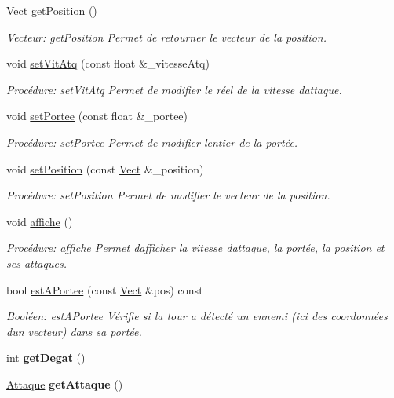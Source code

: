 \begin{DoxyCompactItemize}
\hyperlink{classVect}{Vect} \hyperlink{classTour_a2283f61d6b088bf41c53c882f4a72864}{get\+Position} ()
\begin{DoxyCompactList}\small\item\em Vecteur\+: get\+Position Permet de retourner le vecteur de la position. \end{DoxyCompactList}\item 
void \hyperlink{classTour_a110c73fc4160189cdafbb700f3999a39}{set\+Vit\+Atq} (const float \&\+\_\+vitesse\+Atq)
\begin{DoxyCompactList}\small\item\em Procédure\+: set\+Vit\+Atq Permet de modifier le réel de la vitesse d\textquotesingle{}attaque. \end{DoxyCompactList}\item 
void \hyperlink{classTour_a7f9a17a8138ebd8afe72520d7d8a18db}{set\+Portee} (const float \&\+\_\+portee)
\begin{DoxyCompactList}\small\item\em Procédure\+: set\+Portee Permet de modifier l\textquotesingle{}entier de la portée. \end{DoxyCompactList}\item 
void \hyperlink{classTour_a1db07b7ed15a7b0d11e96bb67831feba}{set\+Position} (const \hyperlink{classVect}{Vect} \&\+\_\+position)
\begin{DoxyCompactList}\small\item\em Procédure\+: set\+Position Permet de modifier le vecteur de la position. \end{DoxyCompactList}\item 
void \hyperlink{classTour_a418908de2fcbb83e8e9459a999f98aa6}{affiche} ()
\begin{DoxyCompactList}\small\item\em Procédure\+: affiche Permet d\textquotesingle{}afficher la vitesse d\textquotesingle{}attaque, la portée, la position et ses attaques. \end{DoxyCompactList}\item 
bool \hyperlink{classTour_ad9f4d42370374f373f48f7d0fb36559a}{est\+A\+Portee} (const \hyperlink{classVect}{Vect} \&pos) const
\begin{DoxyCompactList}\small\item\em Booléen\+: est\+A\+Portee Vérifie si la tour a détecté un ennemi (ici des coordonnées d\textquotesingle{}un vecteur) dans sa portée. \end{DoxyCompactList}\item 
\mbox{\label{classTour_a19e9adc634af6ed58dac224ade1986b8}} 
int {\bfseries get\+Degat} ()
\item 
\mbox{\label{classTour_a647b54e61e3ee195a5e830b3cd677197}} 
\hyperlink{classAttaque}{Attaque} {\bfseries get\+Attaque} ()
\end{DoxyCompactItemize}


